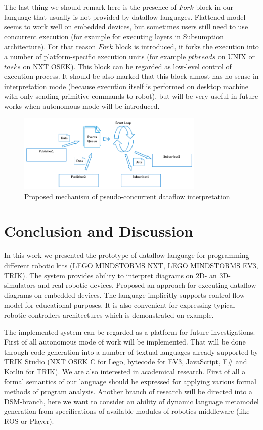\documentclass[conference,compsoc]{IEEEtran}
\begin{document}
The last thing we should remark here is the presence of $Fork$ block in our language that usually is not provided by dataflow languages. Flattened model seems to work well on embedded devices, but sometimes users still need to use concurrent execution (for example for executing layers in Subsumption architecture). For that reason $Fork$ block is introduced, it forks the execution into a number of platform-specific execution units (for example $pthreads$ on UNIX or $tasks$ on NXT OSEK). This block can be regarded as low-level control of execution process. It should be also marked that this block almost has no sense in interpretation mode (because execution itself is performed on desktop machine with only sending primitive commands to robot), but will be very useful in future works when autonomous mode will be introduced.

\begin{figure}[ht]
	\centering
	\includegraphics[width=3.5in]{Interaction.png}
	\caption{Proposed mechanism of pseudo-concurrent dataflow interpretation}
	\label{image:interpreter-interaction}
\end{figure}


\section{Conclusion and Discussion}
\label{sec:Conclusion}
In this work we presented the prototype of dataflow language for programming different robotic kits (LEGO MINDSTORMS NXT, LEGO MINDSTORMS EV3, TRIK). The system provides ability to interpret diagrams on 2D- an 3D-simulators and real robotic devices. Proposed an approach for executing dataflow diagrams on embedded devices. The language implicitly supports control flow model for educational purposes. It is also convenient for expressing typical robotic controllers architectures which is demonstrated on example.

The implemented system can be regarded as a platform for future investigations. First of all autonomous mode of work will be implemented. That will be done through code generation into a number of textual languages already supported by TRIK Studio (NXT OSEK C for Lego, bytecode for EV3, JavaScript, F\#\cite{kirsanov2014robotics} and Kotlin for TRIK). We are also interested in academical research. First of all a formal semantics of our language should be expressed for applying various formal methods of program analysis. Another branch of research will be directed into a DSM-branch, here we want to consider an ability of dynamic language metamodel generation from specifications of available modules of robotics middleware (like ROS\cite{quigley2009ros} or Player\cite{gerkey2003player}).

\newpage


\end{document}

